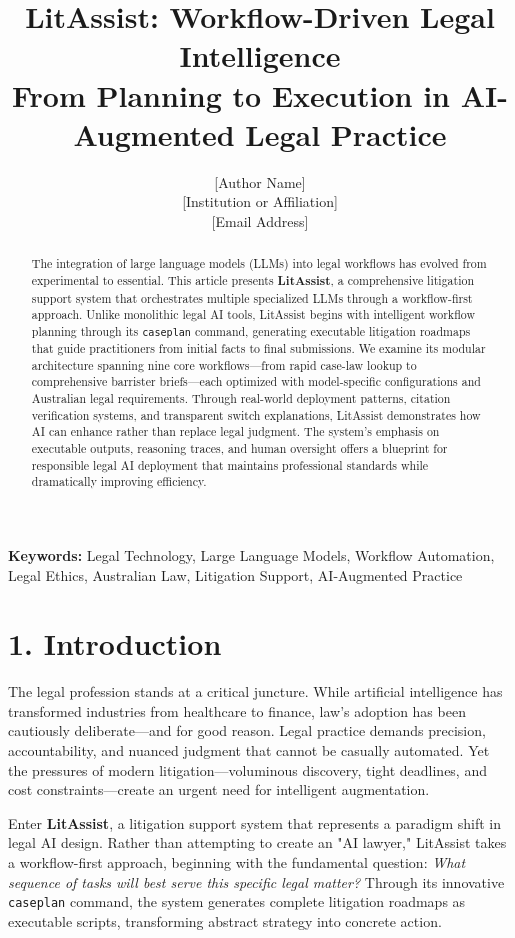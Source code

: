 \documentclass[12pt,a4paper]{article}
\title{\textbf{LitAssist: Workflow-Driven Legal Intelligence} \\ \large From Planning to Execution in AI-Augmented Legal Practice}
\author{[Author Name]\\
\small [Institution or Affiliation] \\
\small [Email Address]}
\date{}
\begin{document}
\maketitle

\begin{abstract}
\noindent
The integration of large language models (LLMs) into legal workflows has evolved from experimental to essential. This article presents \textbf{LitAssist}, a comprehensive litigation support system that orchestrates multiple specialized LLMs through a workflow-first approach. Unlike monolithic legal AI tools, LitAssist begins with intelligent workflow planning through its \texttt{caseplan} command, generating executable litigation roadmaps that guide practitioners from initial facts to final submissions. We examine its modular architecture spanning nine core workflows—from rapid case-law lookup to comprehensive barrister briefs—each optimized with model-specific configurations and Australian legal requirements. Through real-world deployment patterns, citation verification systems, and transparent switch explanations, LitAssist demonstrates how AI can enhance rather than replace legal judgment. The system's emphasis on executable outputs, reasoning traces, and human oversight offers a blueprint for responsible legal AI deployment that maintains professional standards while dramatically improving efficiency.
\end{abstract}

\vspace{1em}
\noindent \textbf{Keywords:} Legal Technology, Large Language Models, Workflow Automation, Legal Ethics, Australian Law, Litigation Support, AI-Augmented Practice

\section*{1. Introduction}

The legal profession stands at a critical juncture. While artificial intelligence has transformed industries from healthcare to finance, law's adoption has been cautiously deliberate—and for good reason. Legal practice demands precision, accountability, and nuanced judgment that cannot be casually automated. Yet the pressures of modern litigation—voluminous discovery, tight deadlines, and cost constraints—create an urgent need for intelligent augmentation.

Enter \textbf{LitAssist}, a litigation support system that represents a paradigm shift in legal AI design. Rather than attempting to create an "AI lawyer," LitAssist takes a workflow-first approach, beginning with the fundamental question: \textit{What sequence of tasks will best serve this specific legal matter?} Through its innovative \texttt{caseplan} command, the system generates complete litigation roadmaps as executable scripts, transforming abstract strategy into concrete action.
\end{document}

